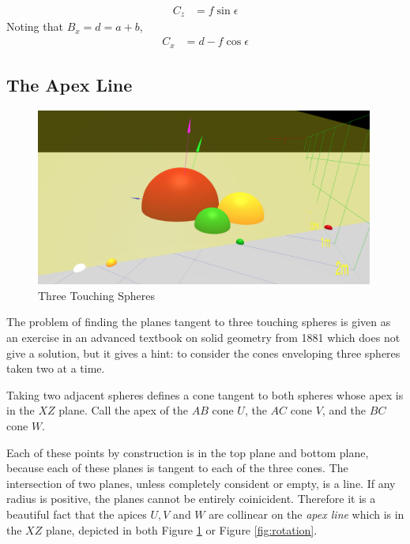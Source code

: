 \documentclass{article}
\begin{document}
\begin{align}
 C_z  &= f\sin{\epsilon}
\end{align}
Noting that $B_x = d = a + b$,
\begin{align}
  C_x   &= d - f\cos{\epsilon}
\end{align}


\subsection{The Apex Line}

\begin{figure}
     \centering
     \includegraphics[width=0.99\textwidth]{figures/StandardThreeSphereDiagram.png}
     \caption{Three Touching Spheres}
  \label{fig:fixed}
\end{figure}

The problem of finding the planes tangent to three touching spheres
is given as an exercise in an advanced textbook on solid geometry from 1881\cite{payne1881} which does not give a solution,
but it gives a hint: to consider the cones enveloping
three spheres taken two at a time.

Taking two adjacent spheres defines a cone tangent to both spheres whose apex is in the $XZ$ plane.
Call the apex of the $AB$ cone $U$, the $AC$ cone $V$, and the $BC$ cone $W$.


Each of these points by construction is in the top plane and bottom plane, because each of these planes
is tangent to each of the three cones.
The intersection of two planes, unless completely consident or empty, is a line.
If any radius is positive, the planes cannot be entirely coinicident.
Therefore it is a beautiful fact that the apices $U,V$ and $W$ are collinear
on the {\em apex line} which is in the $XZ$ plane, depicted in both Figure \ref{fig:fixed}
or Figure \ref{fig:rotation}.
\end{document}
